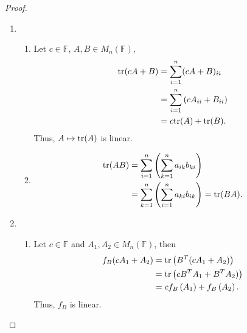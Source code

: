 \documentclass[11pt]{book}
\theoremstyle{definition}
\numberwithin{equation}{subsection}
\begin{document}
\begin{proof}
~\begin{enumerate}[label=(\roman*)]
    \item \begin{enumerate}[label=\alph*)]
        \item Let $c \in \mathbb{F}$, $A, B \in M_n(\mathbb{F})$, 
        \begin{align*}
            {\rm tr}(cA + B) & = \sum^n_{i=1} (cA + B)_{ii} \\
            & = \sum^n_{i=1} \left(cA_{ii} + B_{ii}\right) \\
            & = c {\rm tr}(A) + {\rm tr}(B).
        \end{align*}
        Thus, $A \mapsto {\rm tr}(A)$ is linear.
        
        \item 
        \begin{align*}
            {\rm tr}(AB) & = \sum^n_{i=1}\left(\sum^n_{k=1} a_{ik} b_{ki}\right) \\
            & = \sum^n_{k=1}\left(\sum^n_{i=1} a_{ki} b_{ik}\right) = {\rm tr}(BA).
        \end{align*}
    \end{enumerate}
    
    \item \begin{enumerate}[label=\alph*)]
        \item Let $c \in \mathbb{F}$ and $A_1, A_2 \in  M_n(\mathbb{F})$, then
        \begin{align*}
            f_B(cA_1 + A_2) & = {\rm tr}\left(B^T (cA_1 + A_2)\right) \\
            & = {\rm tr}\left(c B^T A_1 + B^T A_2)\right) \\
            & = c f_B\left(A_1\right) + f_B\left(A_2\right).
        \end{align*}
        Thus, $f_B$ is linear.
        

\end{enumerate}
\end{enumerate}
\end{proof}
\end{document}
